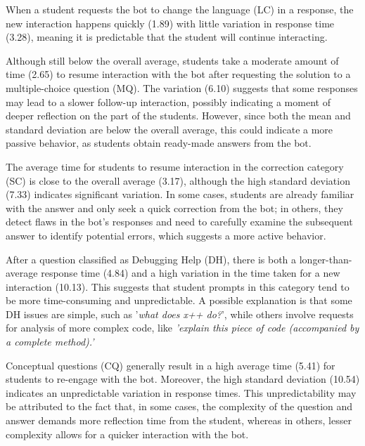 \documentclass[a4paper,twoside]{article}
\begin{document}
When a student requests the bot to change the language (LC) in a response, the
new interaction happens quickly (1.89) with little variation in response time
(3.28), meaning it is predictable that the student will continue interacting.

Although still below the overall average, students take a moderate amount of
time (2.65) to resume interaction with the bot after requesting the solution to
a multiple-choice question (MQ). The variation (6.10) suggests that some
responses may lead to a slower follow-up interaction, possibly indicating a
moment of deeper reflection on the part of the students. However, since both the
mean and standard deviation are below the overall average, this could indicate
a more passive behavior, as students obtain ready-made answers from the bot.


The average time for students to resume interaction in the correction category
(SC) is close to the overall average (3.17), although the high standard
deviation (7.33) indicates significant variation. In some cases, students are
already familiar with the answer and only seek a quick correction from the bot;
in others, they detect flaws in the bot's responses and need to carefully
examine the subsequent answer to identify potential errors, which suggests a
more active behavior.

After a question classified as Debugging Help (DH), there is both a
longer-than-average response time (4.84) and a high variation in the time taken
for a new interaction (10.13). This suggests that student prompts in this
category tend to be more time-consuming and unpredictable. A possible
explanation is that some DH issues are simple, such as '\textit{what does x++ do?}',
while others involve requests for analysis of more complex code, like
\textit{'explain this piece of code (accompanied by a complete method).'}

Conceptual questions (CQ) generally result in a high average time (5.41) for
students to re-engage with the bot. Moreover, the high standard deviation
(10.54) indicates an unpredictable variation in response times. This
unpredictability may be attributed to the fact that, in some cases, the
complexity of the question and answer demands more reflection time from the
student, whereas in others, lesser complexity allows for a quicker interaction
with the bot.
\end{document}
